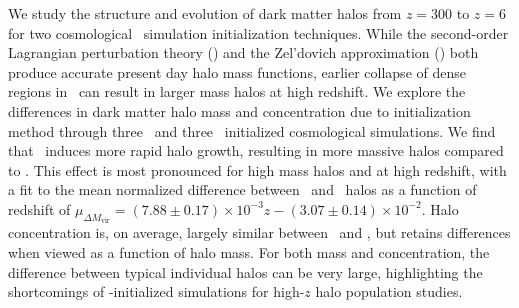 
%
%
%
%


We study the structure and evolution of dark matter halos from $z = 300$ to $z = 6$ for two cosmological \nbody\ simulation initialization techniques.  While the second-order Lagrangian perturbation theory (\lpt) and the Zel'dovich approximation (\za) both produce accurate present day halo mass functions, earlier collapse of dense regions in \lpt\ can result in larger mass halos at high redshift.  We explore the differences in dark matter halo mass and concentration due to initialization method through three \lpt\ and three \za\ initialized cosmological simulations.  We find that \lpt\ induces more rapid halo growth, resulting in more massive halos compared to \za.  This effect is most pronounced for high mass halos and at high redshift, with a fit to the mean normalized difference between \lpt\ and \za\ halos as a function of redshift of $\mu_{\Delta M_{\mathrm{vir}}} = (7.88 \pm 0.17) \times 10^{-3} z - (3.07 \pm 0.14) \times 10^{-2}$.  Halo concentration is, on average, largely similar between \lpt\ and \za, but retains differences when viewed as a function of halo mass.  For both mass and concentration, the difference between typical individual halos can be very large, highlighting the shortcomings of \za-initialized simulations for high-$z$ halo population studies.




